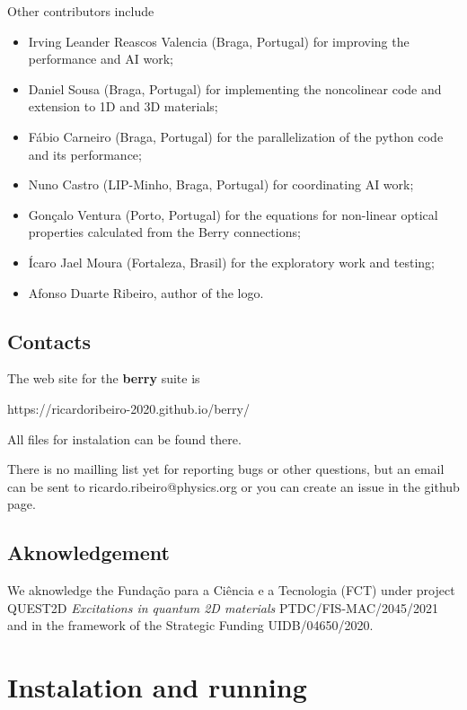 \documentclass[a4paper,12pt]{report}
\begin{document}
Other contributors include
\begin{itemize}
 \item Irving Leander Reascos Valencia (Braga, Portugal) for improving the performance
 and AI work;
 \item Daniel Sousa (Braga, Portugal) for implementing the noncolinear code
 and extension to 1D and 3D materials;
 \item Fábio Carneiro (Braga, Portugal) for the parallelization of the python code
 and its performance;
 \item Nuno Castro (LIP-Minho, Braga, Portugal) for coordinating AI work;
 \item Gonçalo Ventura (Porto, Portugal) for the equations for non-linear optical properties
 calculated from the Berry connections;
 \item Ícaro Jael Moura (Fortaleza, Brasil) for the exploratory work and testing;
 \item Afonso Duarte Ribeiro, author of the logo.
\end{itemize}




\section{Contacts}

The web site for the \textbf{berry} suite is\medskip

https://ricardoribeiro-2020.github.io/berry/\medskip

All files for instalation can be found there.

There is no mailling list yet for reporting bugs or other questions, but an email can be sent to
ricardo.ribeiro@physics.org or you can create an issue in the github page.

\section{Aknowledgement}

We aknowledge the Fundação para a Ciência e a Tecnologia (FCT)
under project \\ QUEST2D \emph{Excitations in quantum 2D materials}
PTDC/FIS-MAC/2045/2021 \\
and in the framework of the Strategic Funding UIDB/04650/2020.






\chapter{Instalation and running}
\end{document}
